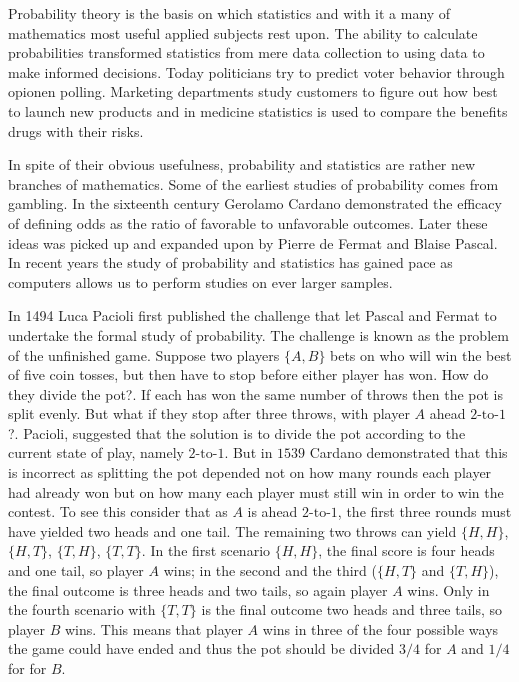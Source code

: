 Probability theory is the basis on which statistics and with it a many of mathematics most useful applied subjects rest upon. The ability to calculate probabilities transformed statistics from mere data collection to using data to make informed decisions. Today politicians try to predict voter behavior through opionen polling. Marketing departments study customers to figure out how best to launch new products and in medicine statistics is used to compare the benefits drugs with their risks.

\myindent In spite of their obvious usefulness, probability and statistics are rather new branches of mathematics. Some of the earliest studies of probability comes from gambling. In the sixteenth century Gerolamo Cardano demonstrated the efficacy of defining odds as the ratio of favorable to unfavorable outcomes. Later these ideas was picked up and expanded upon by Pierre de Fermat and Blaise Pascal. In recent years the study of probability and statistics has gained pace as computers allows us to perform studies on ever larger samples.

\myindent In 1494 Luca Pacioli first published the challenge that let Pascal and Fermat to undertake the formal study of probability. The challenge is known as the problem of the unfinished game. Suppose two players $\{A, B\}$ bets on who will win the best of five coin tosses, but then have to stop before either player has won. How do they divide the pot?. If each has won the same number of throws then the pot is split evenly. But what if they stop after three throws, with player $A$ ahead $2\text{-to-}1$?. Pacioli, suggested that the solution is to divide the pot according to the current state of play, namely $2\text{-to-}1$. But in $1539$ Cardano demonstrated that this is incorrect as splitting the pot depended not on how many rounds each player had already won but on how many each player must still win in order to win the contest. To see this consider that as $A$ is ahead $2\text{-to-}1$, the first three rounds must have yielded two heads and one tail. The remaining two throws can yield $\{H,H\}$, $\{H,T\}$, $\{T,H\}$, $\{T,T\}$. In the first scenario $\{H,H\}$, the final score is four heads and one tail, so player $A$ wins; in the second and the third ($\{H,T\}$ and $\{T,H\}$), the final outcome is three heads and two tails, so again player $A$ wins. Only in the fourth scenario with $\{T,T\}$ is the final outcome two heads and three tails, so player $B$ wins. This means that player $A$ wins in three of the four possible ways the game could have ended and thus the pot should be divided $3/4$ for $A$ and $1/4$ for for $B$.


